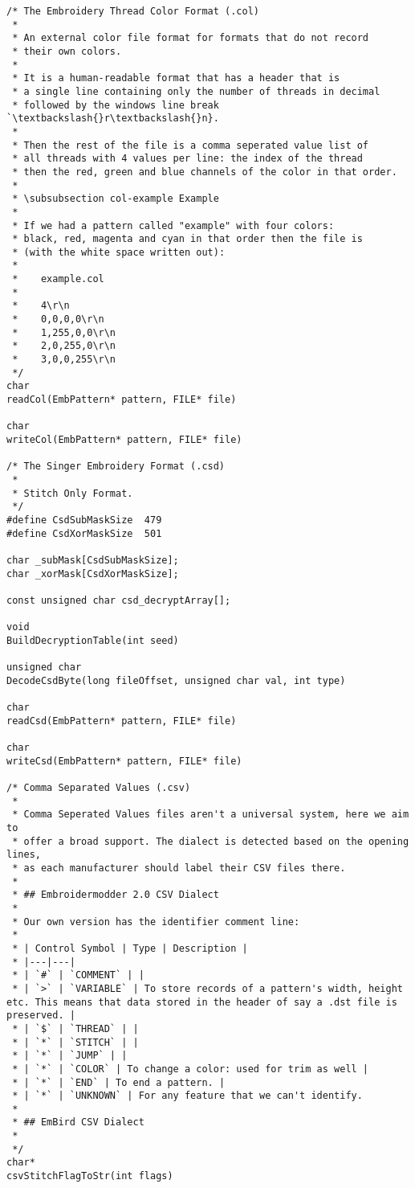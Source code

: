 \begin{lstlisting}
/* The Embroidery Thread Color Format (.col)
 *
 * An external color file format for formats that do not record
 * their own colors.
 *
 * It is a human-readable format that has a header that is
 * a single line containing only the number of threads in decimal
 * followed by the windows line break  `\textbackslash{}r\textbackslash{}n}.
 *
 * Then the rest of the file is a comma seperated value list of
 * all threads with 4 values per line: the index of the thread
 * then the red, green and blue channels of the color in that order.
 *
 * \subsubsection col-example Example
 *
 * If we had a pattern called "example" with four colors:
 * black, red, magenta and cyan in that order then the file is
 * (with the white space written out):
 *
 *    example.col
 *
 *    4\r\n
 *    0,0,0,0\r\n
 *    1,255,0,0\r\n
 *    2,0,255,0\r\n
 *    3,0,0,255\r\n
 */
char
readCol(EmbPattern* pattern, FILE* file)

char
writeCol(EmbPattern* pattern, FILE* file)

/* The Singer Embroidery Format (.csd)
 *
 * Stitch Only Format.
 */
#define CsdSubMaskSize  479
#define CsdXorMaskSize  501

char _subMask[CsdSubMaskSize];
char _xorMask[CsdXorMaskSize];

const unsigned char csd_decryptArray[];

void
BuildDecryptionTable(int seed)

unsigned char
DecodeCsdByte(long fileOffset, unsigned char val, int type)

char
readCsd(EmbPattern* pattern, FILE* file)

char
writeCsd(EmbPattern* pattern, FILE* file)

/* Comma Separated Values (.csv)
 *
 * Comma Seperated Values files aren't a universal system, here we aim to
 * offer a broad support. The dialect is detected based on the opening lines,
 * as each manufacturer should label their CSV files there.
 *
 * ## Embroidermodder 2.0 CSV Dialect
 *
 * Our own version has the identifier comment line:
 *
 * | Control Symbol | Type | Description |
 * |---|---|
 * | `#` | `COMMENT` | |
 * | `>` | `VARIABLE` | To store records of a pattern's width, height etc. This means that data stored in the header of say a .dst file is preserved. |
 * | `$` | `THREAD` | |
 * | `*` | `STITCH` | |
 * | `*` | `JUMP` | |
 * | `*` | `COLOR` | To change a color: used for trim as well |
 * | `*` | `END` | To end a pattern. |
 * | `*` | `UNKNOWN` | For any feature that we can't identify.
 *
 * ## EmBird CSV Dialect
 *
 */
char*
csvStitchFlagToStr(int flags)


\end{lstlisting}
